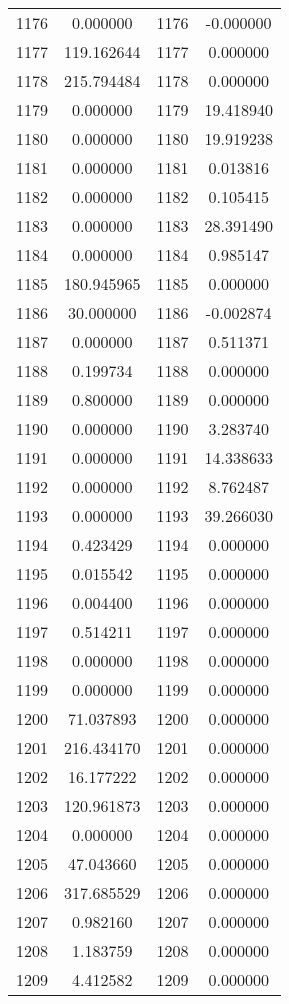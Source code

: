 \documentclass[12pt]{article}
\begin{document}
\begin{longtable}{@{}cccc@{}}
1176 & 0.000000 & 1176 & -0.000000 \\
1177 & 119.162644 & 1177 & 0.000000 \\
1178 & 215.794484 & 1178 & 0.000000 \\
1179 & 0.000000 & 1179 & 19.418940 \\
1180 & 0.000000 & 1180 & 19.919238 \\
1181 & 0.000000 & 1181 & 0.013816 \\
1182 & 0.000000 & 1182 & 0.105415 \\
1183 & 0.000000 & 1183 & 28.391490 \\
1184 & 0.000000 & 1184 & 0.985147 \\
1185 & 180.945965 & 1185 & 0.000000 \\
1186 & 30.000000 & 1186 & -0.002874 \\
1187 & 0.000000 & 1187 & 0.511371 \\
1188 & 0.199734 & 1188 & 0.000000 \\
1189 & 0.800000 & 1189 & 0.000000 \\
1190 & 0.000000 & 1190 & 3.283740 \\
1191 & 0.000000 & 1191 & 14.338633 \\
1192 & 0.000000 & 1192 & 8.762487 \\
1193 & 0.000000 & 1193 & 39.266030 \\
1194 & 0.423429 & 1194 & 0.000000 \\
1195 & 0.015542 & 1195 & 0.000000 \\
1196 & 0.004400 & 1196 & 0.000000 \\
1197 & 0.514211 & 1197 & 0.000000 \\
1198 & 0.000000 & 1198 & 0.000000 \\
1199 & 0.000000 & 1199 & 0.000000 \\
1200 & 71.037893 & 1200 & 0.000000 \\
1201 & 216.434170 & 1201 & 0.000000 \\
1202 & 16.177222 & 1202 & 0.000000 \\
1203 & 120.961873 & 1203 & 0.000000 \\
1204 & 0.000000 & 1204 & 0.000000 \\
1205 & 47.043660 & 1205 & 0.000000 \\
1206 & 317.685529 & 1206 & 0.000000 \\
1207 & 0.982160 & 1207 & 0.000000 \\
1208 & 1.183759 & 1208 & 0.000000 \\
1209 & 4.412582 & 1209 & 0.000000 \\

\end{longtable}
\end{document}
